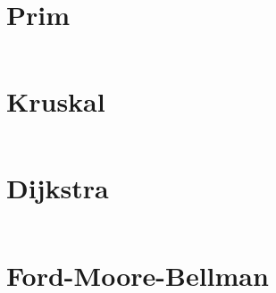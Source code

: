 \documentclass[10pt,a4paper]{report}
\begin{document}
\begin{appendices}
\chapter{Prim}
\inputminted[fontsize=\footnotesize,linenos,breaklines]{python}{../prim.py}
\chapter{Kruskal}
\inputminted[fontsize=\footnotesize,linenos,breaklines]{python}{../kruskal.py}
\chapter{Dijkstra}
\inputminted[fontsize=\footnotesize,linenos,breaklines]{python}{../dijkstra.py}
\chapter{Ford-Moore-Bellman}
\inputminted[fontsize=\footnotesize,linenos,breaklines]{python}{../ford_moore_bellman.py}
\end{appendices}
\end{document}
